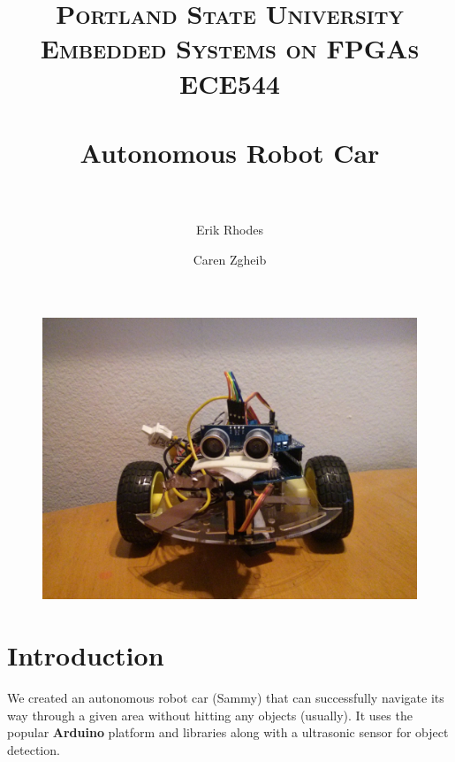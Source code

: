 \documentclass[11pt]{article}
\title{	
\normalfont \normalsize 
\textsc{\LARGE Portland State University}\\[1.5cm] %
\textsc{\Large Embedded Systems on FPGAs}\\[0.5cm] %
\textsc{\large ECE544}\\[0.5cm] %
\horrule{1.2pt} \\[0.4cm] %
\huge Autonomous Robot Car \\ %
\horrule{1.2pt} \\[0.5cm] %
}
\begin{document}
\raggedright
\author{Erik Rhodes \and Caren Zgheib} %
\maketitle %
\thispagestyle{empty}


\begin{figure}[h]\centering
\includegraphics[height=0.65\textwidth]{images/bot_front.jpg}
		\label{bot_front}
	\end{figure}
	
\tableofcontents
\newpage



\section{Introduction} 
We created an autonomous robot car (Sammy) that can successfully navigate its way through a given area without hitting any objects (usually).  It uses the popular \textbf{Arduino} platform and libraries along with a ultrasonic sensor for object detection.  
\end{document}
